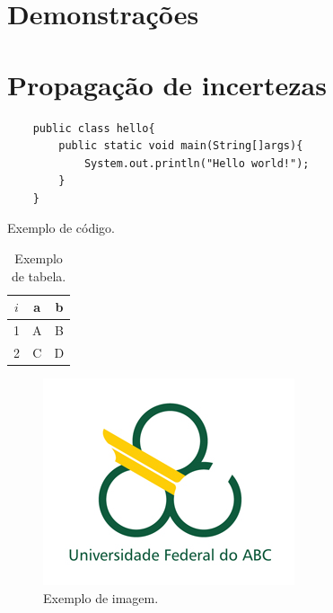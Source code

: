 \documentclass[report,14pt,openright,oneside,a4paper,brazil]{abntex2}
\newenvironment{code}{\captionsetup{type=listing}}{}
\begin{document}
\chapter{Demonstrações}

\chapter{Propagação de incertezas}

\begin{code}
\begin{verbatim}
    public class hello{
        public static void main(String[]args){
            System.out.println("Hello world!");
        }
    }
\end{verbatim}
\caption{Exemplo de código.}
\label{code:ex}
\end{code}

\begin{table}[H]
    \centering
    \begin{tabular}{|c|c|c|}
         \hline
         $i$ & a & b \\
         \hline
         1 & A & B \\
         2 & C & D \\
         \hline
    \end{tabular}
    \caption{Exemplo de tabela.}
    \label{tab:ex}
\end{table}

\begin{figure}[H]
    \centering
    \includegraphics[scale=0.8]{logo.jpg}
    \caption{Exemplo de imagem.}
    \label{fig:ex}
\end{figure}
\end{document}
